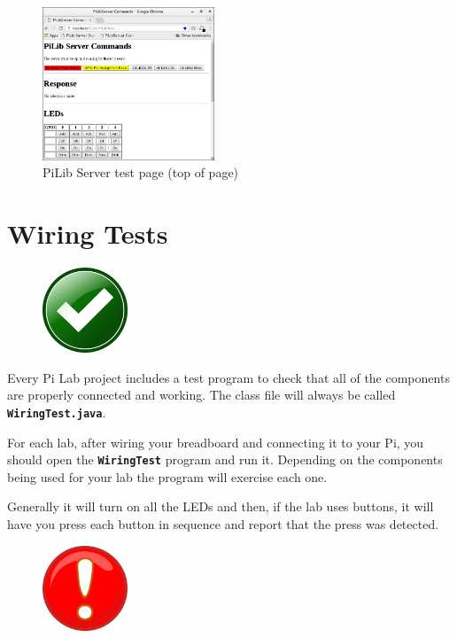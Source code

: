 \begin{figure}[H]
	\centering
	\includegraphics[height=1.8in]{pi_images/PiLibServerTestPage.png}
	\caption{PiLib Server test page (top of page)}
	\label{fig:servertestpage}
\end{figure}

\section{Wiring Tests}
\label{wiringTestDescription}

\beforefig
\begin{figure}
	\centerline{\includegraphics[height=1in]{images/approved-151676_960_720.png}}
\end{figure}
\afterfig

Every Pi Lab project includes a test program to check that all of the components are properly connected and working. The class file will always be called \textbf{\texttt{WiringTest.java}}.

For each lab, after wiring your breadboard and connecting it to your Pi, you should open the \textbf{\texttt{WiringTest}} program and run it. Depending on the components being used for your lab the program will exercise each one.

Generally it will turn on all the LEDs and then, if the lab uses buttons, it will have you press each button in sequence and report that the press was detected.

\beforefig
\begin{figure}
\centerline{\includegraphics[height=1in]{images/exclamation-mark-red-md.png}}
\end{figure}
\afterfig

